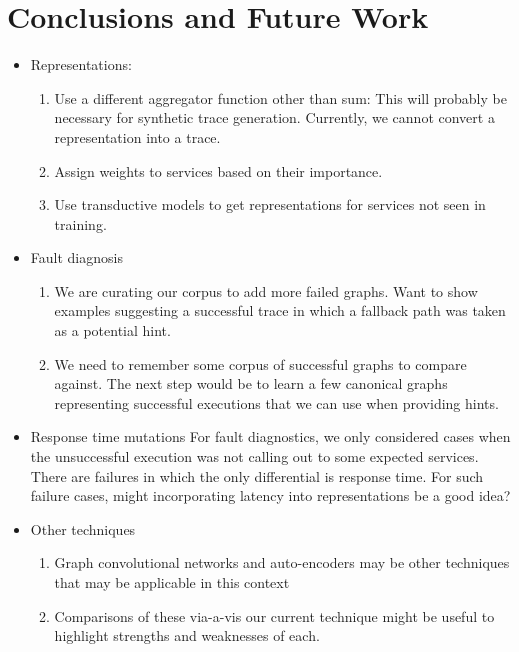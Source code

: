 \section{Conclusions and Future Work}
\begin{itemize}
\item Representations:
    \begin{enumerate}
    \item Use a different aggregator function other than sum:
    This will probably be necessary for synthetic trace generation. Currently, we cannot convert a representation into a trace. 
    \item Assign weights to services based on their importance.
    \item Use transductive models to get representations for services not seen in training.
    \end{enumerate}
\item Fault diagnosis
    \begin{enumerate}
    \item We are curating our corpus to add more failed graphs. Want to show examples suggesting a successful trace in which a fallback path was taken as a potential hint.
    \item We need to remember some corpus of successful graphs to compare against. The next step would be to learn a few canonical graphs representing successful executions that we can use when providing hints.
    \end{enumerate}
\item Response time mutations
For fault diagnostics, we only considered cases when the unsuccessful execution was not calling out to some expected services. There are failures in which the only differential is response time. For such failure cases, might incorporating latency into representations be a good idea?
\item Other techniques
    \begin{enumerate}
    \item Graph convolutional networks and auto-encoders may be other techniques that may be applicable in this context
    \item Comparisons of these via-a-vis our current technique might be useful to highlight strengths and weaknesses of each.
    \end{enumerate}
\end{itemize}


